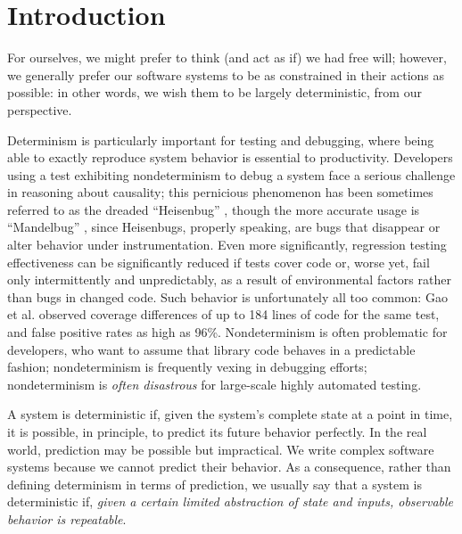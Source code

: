 \section{Introduction}

For ourselves, we might prefer to think (and act as if) we had free
will; however, we generally prefer our software systems to be as
constrained in their actions as possible:  in other words, we wish
them to be largely deterministic, from our perspective.

Determinism is particularly important for testing and debugging, where
being able to exactly reproduce system behavior is essential to
productivity.  Developers using a test exhibiting nondeterminism
to debug a system
face a serious challenge in reasoning about causality; this
pernicious phenomenon has been sometimes referred to as the dreaded
``Heisenbug'' \cite{Heisenbug}, though the more accurate usage is
``Mandelbug'' \cite{GrottkeBugs,FaultTriggers}, since Heisenbugs, properly speaking, are bugs that disappear or
alter behavior under instrumentation.
Even more significantly, regression testing
effectiveness can be significantly reduced if tests cover code or,
worse yet, fail only
intermittently and unpredictably, as a result of environmental
factors rather than bugs in changed code.  Such behavior is
unfortunately all too common:  Gao et
al. \cite{Gao:2015:MSU:2818754.2818764} observed coverage differences
of up to 184 lines of code for the same test, and false positive rates
as high as 96\%.  Nondeterminism is often problematic for
developers, who want to  assume that library code behaves in a  predictable fashion; nondeterminism is
frequently vexing in debugging efforts; nondeterminism is \emph{often disastrous} for large-scale highly
automated testing.



A system is deterministic if, given the system's complete state at a point in
time, it is possible, in principle, to predict its future behavior
perfectly.  In the real world,
prediction may be possible but  impractical.  We write
complex software systems because we cannot predict their
behavior.  As a consequence, rather than
defining determinism in terms of prediction, we usually 
say that a system is deterministic if, \emph{given a certain limited abstraction of state
and inputs, observable behavior is repeatable}.  %

